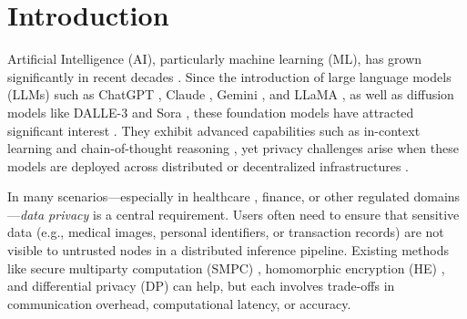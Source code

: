 \documentclass[10pt]{article}
\begin{document}

\section{Introduction}
\label{sec:intro}

Artificial Intelligence (AI), particularly machine learning (ML), has grown significantly in recent decades \cite{jordan2015machine}.
Since the introduction of large language models (LLMs) such as ChatGPT \cite{openai2023chatgpt}, 
Claude \cite{anthropic2023claude}, Gemini \cite{google2023gemini}, and LLaMA \cite{llama2024}, as well as diffusion models \cite{ho2020denoising} like DALLE-3 \cite{openai2023dalle3} and Sora \cite{openai2024sora}, these foundation models have attracted significant interest \cite{bommasani2021opportunities}.
They exhibit advanced capabilities such as in-context learning \cite{brown2020language} and chain-of-thought reasoning \cite{wei2022chain}, yet privacy challenges arise when these models are deployed across distributed or decentralized infrastructures \cite{kairouz2021advances}.

In many scenarios—especially in healthcare \cite{price2019privacy}, finance, or other regulated domains \cite{liu2021privacy}—\textit{data privacy} is a central requirement. Users often need to ensure that sensitive data (e.g., medical images, personal identifiers, or transaction records) are not visible to untrusted nodes in a distributed inference pipeline. 
Existing methods like secure multiparty computation (SMPC) \cite{evans2018pragmatic}, homomorphic encryption (HE) \cite{gentry2009fully}, and differential privacy (DP) \cite{dwork2014algorithmic} can help, but each involves trade-offs in communication overhead, computational latency, or accuracy.
\end{document}
